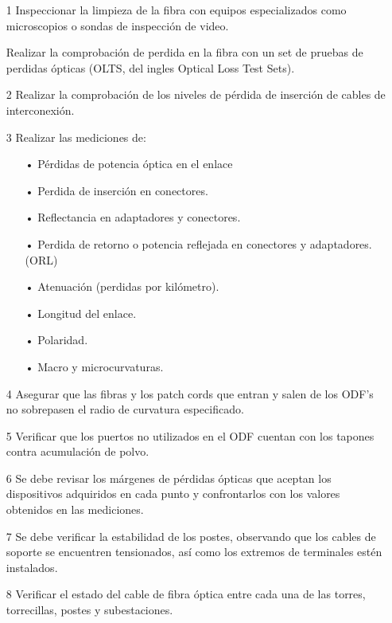 \begin{enumerate}
\item[1]Inspeccionar la limpieza de la fibra con equipos especializados como microscopios o sondas de inspección de video.

Realizar la comprobación de perdida en la fibra con un set de pruebas de perdidas ópticas (OLTS, del ingles Optical Loss Test Sets).


\item[2] Realizar la comprobación de los niveles de pérdida de inserción de cables de interconexión.

\item[3]  Realizar las mediciones de:

\begin{enumerate}
\item[•]Pérdidas de potencia óptica en el enlace
\item[•]Perdida de inserción en conectores.
\item[•]Reflectancia en adaptadores y conectores.
\item[•]Perdida de retorno o potencia reflejada en conectores y adaptadores. (ORL)
\item[•]Atenuación (perdidas por kilómetro).
\item[•]Longitud del enlace.
\item[•]Polaridad.
\item[•]Macro y microcurvaturas.
\end{enumerate}



\end{enumerate}


\begin{enumerate}
\item[4]Asegurar que las fibras y los patch cords que entran y salen de los ODF's no sobrepasen el radio de curvatura especificado.

\item[5]Verificar que los puertos no utilizados en el ODF cuentan con los tapones contra acumulación de polvo.


\item[6]Se debe revisar los márgenes de pérdidas ópticas que aceptan los dispositivos adquiridos en cada punto y confrontarlos con los valores obtenidos en las mediciones.


\item[7]  Se debe verificar la estabilidad de los postes, observando que los cables de soporte se encuentren tensionados, así como los extremos de terminales estén instalados.

\item[8] Verificar el estado del cable de fibra óptica entre cada una de las torres, torrecillas, postes y subestaciones. 





\end{enumerate}




